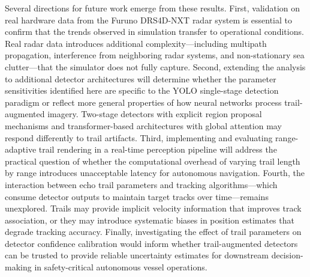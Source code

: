 \documentclass[colorlinks,upint,balance]{asmeconf}
\begin{document}
Several directions for future work emerge from these results. First, validation on real hardware data from the Furuno DRS4D-NXT radar system is essential to confirm that the trends observed in simulation transfer to operational conditions. Real radar data introduces additional complexity---including multipath propagation, interference from neighboring radar systems, and non-stationary sea clutter---that the simulator does not fully capture. Second, extending the analysis to additional detector architectures will determine whether the parameter sensitivities identified here are specific to the YOLO single-stage detection paradigm or reflect more general properties of how neural networks process trail-augmented imagery. Two-stage detectors with explicit region proposal mechanisms and transformer-based architectures with global attention may respond differently to trail artifacts. Third, implementing and evaluating range-adaptive trail rendering in a real-time perception pipeline will address the practical question of whether the computational overhead of varying trail length by range introduces unacceptable latency for autonomous navigation. Fourth, the interaction between echo trail parameters and tracking algorithms---which consume detector outputs to maintain target tracks over time---remains unexplored. Trails may provide implicit velocity information that improves track association, or they may introduce systematic biases in position estimates that degrade tracking accuracy. Finally, investigating the effect of trail parameters on detector confidence calibration would inform whether trail-augmented detectors can be trusted to provide reliable uncertainty estimates for downstream decision-making in safety-critical autonomous vessel operations.



\end{document}

